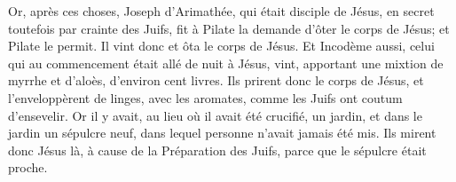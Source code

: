 Or, après ces choses, Joseph d'Arimathée, qui était disciple de Jésus, en
secret toutefois par crainte des Juifs, fit à Pilate la demande d'ôter le
corps de Jésus; et Pilate le permit. Il vint donc et ôta le corps de Jésus.
Et Incodème aussi, celui qui au commencement était allé de nuit à Jésus,
vint, apportant une mixtion de myrrhe et d'aloès, d'environ cent livres. Ils
prirent donc le corps de Jésus, et l'enveloppèrent de linges, avec les
aromates, comme les Juifs ont coutum d'ensevelir. Or il y avait, au lieu où
il avait été crucifié, un jardin, et dans le jardin un sépulcre neuf, dans
lequel personne n'avait jamais été mis. Ils mirent donc Jésus là, à cause de
la Préparation des Juifs, parce que le sépulcre était proche.
